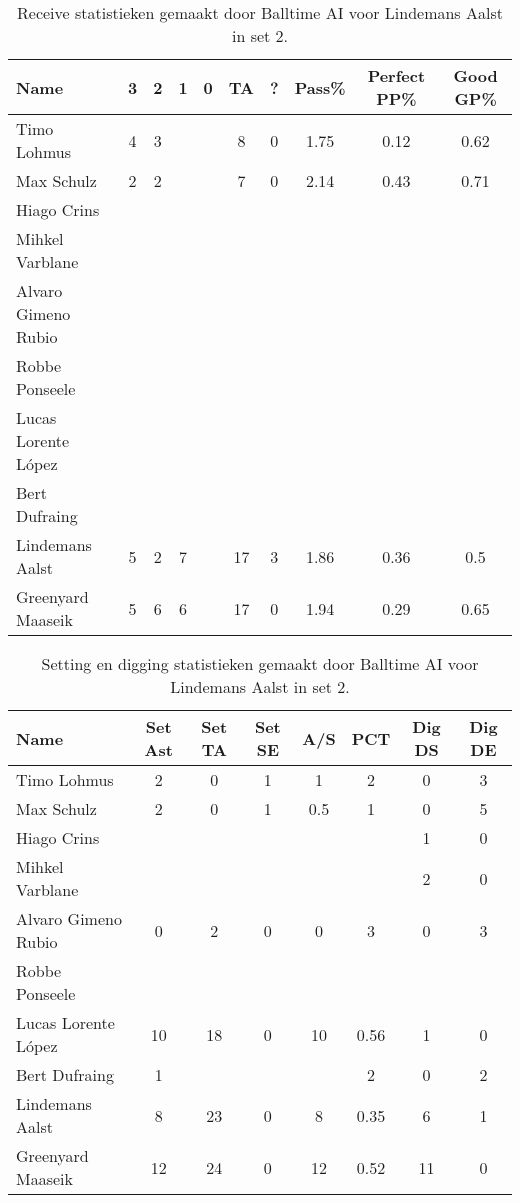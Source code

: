 \begin{table}[ht!]
  \centering
  \scriptsize
  \begin{tabular}{|l|c|c|c|c|c|c|c|c|c|} \hline
    \textbf{Name} & 3 & 2 & 1 & 0 & TA & ? & Pass\% & Perfect PP\% & Good GP\% \\ \hline
    Timo Lohmus & 4 & 3 &  &  & 8 & 0 & 1.75 & 0.12 & 0.62 \\
    Max Schulz & 2 & 2 &  &  & 7 & 0 & 2.14 & 0.43 & 0.71 \\
    Hiago Crins &  &  &  &  &  &  &  &  &  \\
    Mihkel Varblane &  &  &  &  &  &  &  &  &  \\
    Alvaro Gimeno Rubio &  &  &  &  &  &  &  &  &  \\
    Robbe Ponseele &  &  &  &  &  &  &  &  &  \\
    Lucas Lorente López &  &  &  &  &  &  &  &  &  \\
    Bert Dufraing &  &  &  &  &  &  &  &  &  \\
    Lindemans Aalst & 5 & 2 & 7 &  & 17 & 3 & 1.86 & 0.36 & 0.5 \\
    Greenyard Maaseik & 5 & 6 & 6 &  & 17 & 0 & 1.94 & 0.29 & 0.65 \\ \hline
  \end{tabular}
  \caption[Receive statistieken gemaakt door Balltime AI voor Lindemans Aalst in set 2]{\label{tab:PL1ReceiveAalst2}Receive statistieken gemaakt door Balltime AI voor Lindemans Aalst in set 2.}
\end{table}

\begin{table}[ht!]
  \centering
  \scriptsize
  \begin{tabular}{|l|c|c|c|c|c|c|c|} \hline
    \textbf{Name} & Set Ast & Set TA & Set SE & A/S & PCT & Dig DS & Dig DE \\ \hline
    Timo Lohmus & 2 & 0 & 1 & 1 & 2 & 0 & 3 \\
    Max Schulz & 2 & 0 & 1 & 0.5 & 1 & 0 & 5 \\
    Hiago Crins &  &  &  &  &  & 1 & 0 \\
    Mihkel Varblane &  &  &  &  &  & 2 & 0 \\
    Alvaro Gimeno Rubio & 0 & 2 & 0 & 0 & 3 & 0 & 3 \\
    Robbe Ponseele &  &  &  &  &  &  &  \\
    Lucas Lorente López & 10 & 18 & 0 & 10 & 0.56 & 1 & 0 \\
    Bert Dufraing & 1 &  &  &  & 2 & 0 & 2 \\
    Lindemans Aalst & 8 & 23 & 0 & 8 & 0.35 & 6 & 1 \\
    Greenyard Maaseik & 12 & 24 & 0 & 12 & 0.52 & 11 & 0 \\ \hline
  \end{tabular}
  \caption[Setting en digging statistieken gemaakt door Balltime AI voor Lindemans Aalst in set 2]{\label{tab:PL1SetDigAalst2}Setting en digging statistieken gemaakt door Balltime AI voor Lindemans Aalst in set 2.}
\end{table}

